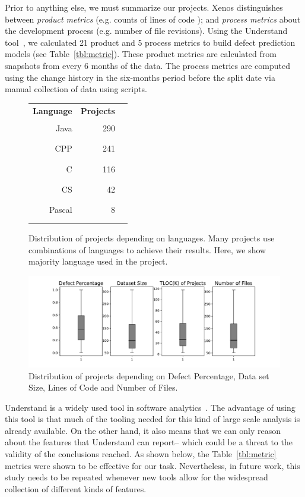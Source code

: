 \documentclass[10pt,journal,compsoc]{IEEEtran}
\begin{document}
Prior to anything else, we must summarize our projects.  Xenos \cite{Xenos} distinguishes
between {\em product metrics} (e.g.  counts of lines
of code );  and  {\em process metrics} 
about the  development process (e.g.    number of file revisions).
Using the   Understand tool~\cite{visualize},
we   calculated 21 product and 5 process metrics to build     defect prediction models
 (see Table~\ref{tbl:metric}).
 These product  metrics are
 calculated from snapshots from every 6 months of the data. The process metrics are computed using the change history in the six-months period before the split date via manual collection of data using scripts.  
 
\begin{figure}
\centering
{\small \renewcommand{\baselinestretch}{0.7}
\begin{tabular}{rrl}
    \textbf{Language} & \textbf{Projects} & \\
    Java & 290 &\rule{41.6pt}{8pt} \\
    CPP & 241 &\rule{34.5pt}{8pt} \\
    C & 116 &\rule{16.6pt}{8pt} \\
    CS & 42 &\rule{6.3pt}{8pt} \\
    Pascal & 8 &\rule{1.1pt}{8pt} \\
     & 
\end{tabular}}
\caption{Distribution of projects depending on languages.
Many  projects use combinations of languages to
achieve their results. Here, we show majority language used in the project.}
\label{fig:lang_projects}
\end{figure}

\begin{figure}[!h]
    \centering
    \includegraphics[width=\linewidth]{figs/meta.pdf}
    \caption{Distribution of projects depending on Defect Percentage, Data set Size, Lines of Code and Number of Files.}
    \label{fig:meta}
\end{figure}


Understand is a widely used tool in software analytics~\cite{Zhang16aa,gizas2012comparative,fontana2011experience,orru2015curated,pattison2008talk,malloy2002testing}.
 The advantage of using this tool is that much of the tooling needed for this kind of large scale analysis is already available. On the other hand, it also means that we can only reason about the features that Understand can report-- which could be  a threat to the validity of the conclusions reached. As shown below, the Table~\ref{tbl:metric} metrics were shown to be effective for our task. Nevertheless, in future work, this study needs to be repeated whenever new tools allow for the widespread collection of different kinds of features.
 
\end{document}
